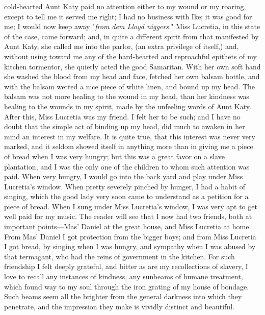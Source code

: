 cold-hearted Aunt Katy paid no attention either to my wound or my
roaring, except to tell me it served me right; I had no business with
Ike; it was good for me; I would now keep away "\emph{from dem Lloyd
niggers.}" Miss Lucretia, in this state of the case, came forward; and,
in quite a different spirit from that manifested by Aunt Katy, she
called me into the parlor, (an extra privilege of itself,) and, without
using toward me any of the hard-hearted and reproachful epithets of my
kitchen tormentor, she quietly acted the good Samaritan. With her own
soft hand she washed the blood from my head and face, fetched her own
balsam bottle, and with the balsam wetted a nice piece of white {}linen,
and bound up my head. The balsam was not more healing to the wound in my
head, than her kindness was healing to the wounds in my spirit, made by
the unfeeling words of Aunt Katy. After this, Miss Lucretia was my
friend. I felt her to be such; and I have no doubt that the simple act
of binding up my head, did much to awaken in her mind an interest in my
welfare. It is quite true, that this interest was never very marked, and
it seldom showed itself in anything more than in giving me a piece of
bread when I was very hungry; but this was a great favor on a slave
plantation, and I was the only one of the children to whom such
attention was paid. When very hungry, I would go into the back yard and
play under Miss Lucretia's window. When pretty severely pinched by
hunger, I had a habit of singing, which the good lady very soon came to
understand as a petition for a piece of bread. When I sung under Miss
Lucretia's window, I was very apt to get well paid for my music. The
reader will see that I now had two friends, both at important
points---Mas' Daniel at the great house, and Miss Lucretia at home. From
Mas' Daniel I got protection from the bigger boys; and from Miss
Lucretia I got bread, by singing when I was hungry, and sympathy when I
was abused by that termagant, who had the reins of government in the
kitchen. For such friendship I felt deeply grateful, and bitter as are
my recollections of slavery, I love to recall any instances of kindness,
any sunbeams of humane treatment, which found way to my soul through the
iron grating of my house of bondage. Such beams seem all the brighter
from {}the general darkness into which they penetrate, and the
impression they make is vividly distinct and beautiful.


